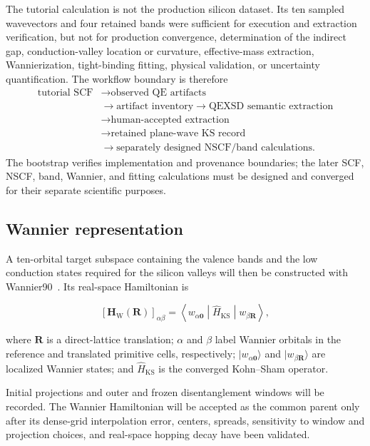 \documentclass[preprint,12pt]{elsarticle}
\begin{document}
The tutorial calculation is not the production silicon dataset. Its ten
sampled wavevectors and four retained bands were sufficient for execution and
extraction verification, but not for production convergence, determination of
the indirect gap, conduction-valley location or curvature, effective-mass
extraction, Wannierization, tight-binding fitting, physical validation, or
uncertainty quantification. The workflow boundary is therefore
\begin{align*}
 \text{tutorial SCF}
 &\longrightarrow \text{observed QE artifacts}\\
 &\longrightarrow \text{artifact inventory}
 \longrightarrow \text{QEXSD semantic extraction}\\
 &\longrightarrow \text{human-accepted extraction}\\
 &\longrightarrow \text{retained plane-wave KS record}\\
 &\longrightarrow \text{separately designed NSCF/band calculations}.
\end{align*}
The bootstrap verifies implementation and provenance boundaries; the later
SCF, NSCF, band, Wannier, and fitting calculations must be designed and
converged for their separate scientific purposes.

\subsection{Wannier representation}
\label{sec:wannier-representation}

A ten-orbital target subspace containing the valence bands and the low
conduction states required for the silicon valleys will then be constructed
with Wannier90~\cite{pizzi2020,souza2001}. Its real-space Hamiltonian is

\begin{equation}
\left[
\bm{H}_{\mathrm{W}}(\bm{R})
\right]_{\alpha\beta}
=
\left\langle
w_{\alpha\bm{0}}
\middle|
\hat{H}_{\mathrm{KS}}
\middle|
w_{\beta\bm{R}}
\right\rangle,
\label{eq:wannier-hamiltonian}
\end{equation}

where $\bm{R}$ is a direct-lattice translation; $\alpha$ and $\beta$ label
Wannier orbitals in the reference and translated primitive cells,
respectively; $\lvert w_{\alpha\bm{0}}\rangle$ and
$\lvert w_{\beta\bm{R}}\rangle$ are localized Wannier states; and
$\hat{H}_{\mathrm{KS}}$ is the converged Kohn--Sham operator.

Initial projections and outer and frozen disentanglement windows will be
recorded. The Wannier Hamiltonian will be accepted as the common parent only
after its dense-grid interpolation error, centers, spreads, sensitivity to
window and projection choices, and real-space hopping decay have been
validated.
\end{document}
